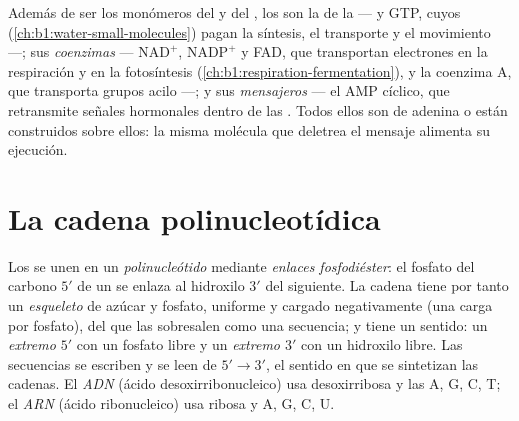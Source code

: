 \begin{proposition}\label{prop:b1:nucleic-acids:threejobs}
Además de ser los monómeros del  y del , los  son la
\emph{} de la  ---  y GTP, cuyos  (\cref{ch:b1:water-small-molecules}) pagan la síntesis, el
transporte y el movimiento ---; sus \emph{coenzimas} --- $\mathrm{NAD^+}$,
$\mathrm{NADP^+}$ y FAD, que transportan electrones en la respiración y en
la fotosíntesis (\cref{ch:b1:respiration-fermentation}), y la coenzima A,
que transporta grupos acilo ---; y sus \emph{mensajeros} --- el AMP cíclico,
que retransmite señales hormonales dentro de las . Todos ellos son
 de adenina o están construidos sobre ellos: la misma molécula
que deletrea el mensaje alimenta su ejecución.
\end{proposition}

\section{La cadena polinucleotídica}

\begin{definition}\label{def:b1:nucleic-acids:chain}
Los  se unen en un
\emph{polinucleótido} mediante \emph{enlaces
fosfodiéster}: el fosfato del carbono $5'$ de un
 se enlaza al hidroxilo $3'$ del siguiente. La cadena tiene por
tanto un \emph{esqueleto} de azúcar y fosfato, uniforme y cargado
negativamente (una carga por fosfato), del que las  sobresalen como una
secuencia; y tiene un sentido: un \emph{extremo $5'$} con un fosfato libre y un
\emph{extremo $3'$} con un hidroxilo libre. Las
secuencias se escriben y se leen de $5' \to 3'$, el sentido en que se
sintetizan las cadenas. El \emph{ADN} (ácido desoxirribonucleico)
usa desoxirribosa y las  A, G, C, T; el \emph{ARN} (ácido
ribonucleico) usa ribosa y A, G, C, U.
\end{definition}

